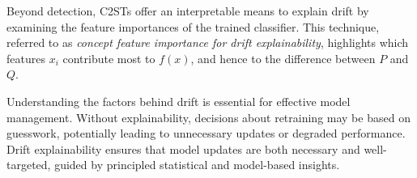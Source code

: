 Beyond detection, C2STs offer an interpretable means to explain drift by
examining the feature importances of the trained classifier. This technique,
referred to as \emph{concept feature importance for drift explainability},
highlights which features $x_i$ contribute most to $f(x)$, and hence to the
difference between $P$ and $Q$.

Understanding the factors behind drift is essential for effective model
management. Without explainability, decisions about retraining may be based on
guesswork, potentially leading to unnecessary updates or degraded performance.
Drift explainability ensures that model updates are both necessary and
well-targeted, guided by principled statistical and model-based insights.